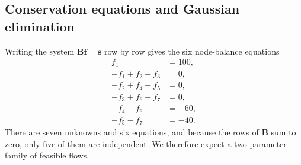 \documentclass[11pt,a4paper]{article}
\newcommand{\mat}[1]{\mathbf{#1}}
\newcommand{\vect}[1]{\mathbf{#1}}
\begin{document}
\subsection{Conservation equations and Gaussian elimination}
\label{sec:refinery-gauss}

Writing the system $\mat{B}\vect{f} = \vect{s}$ row by row gives the
six node-balance equations
\begin{equation}
\begin{aligned}
  f_1 &= 100,\\
 -f_1 + f_2 + f_3 &= 0,\\
 -f_2 + f_4 + f_5 &= 0,\\
 -f_3 + f_6 + f_7 &= 0,\\
 -f_4 - f_6 &= -60,\\
 -f_5 - f_7 &= -40.
\end{aligned}
\label{eq:refinery-balance}
\end{equation}
There are seven unknowns and six equations, and because the rows of
$\mat{B}$ sum to zero, only five of them are independent. We therefore
expect a two-parameter family of feasible flows.
\end{document}
